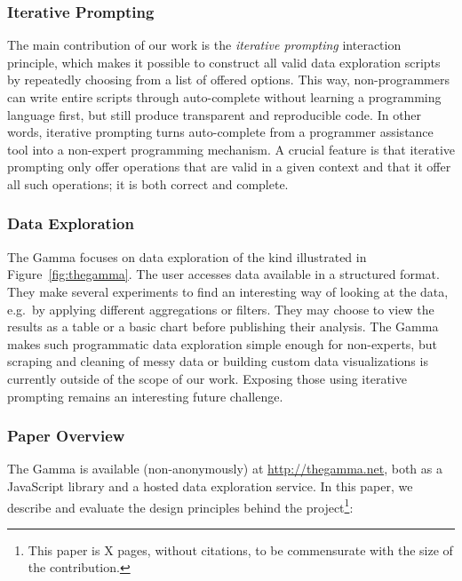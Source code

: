 \documentclass[manuscript,review,anonymous]{acmart}
\begin{document}
\subsubsection*{Iterative Prompting}
The main contribution of our work is the \emph{iterative prompting} interaction principle,
which makes it possible to construct all valid data exploration scripts by repeatedly choosing
from a list of offered options. This way, non-programmers can write entire scripts through
auto-complete without learning a programming language first, but still produce transparent
and reproducible code. In other words, iterative prompting turns auto-complete from a programmer
assistance tool into a non-expert programming mechanism. A crucial feature is that iterative
prompting only offer operations that are valid in a given context and that it offer all such
operations; it is both correct and complete.

\subsubsection*{Data Exploration}
The Gamma focuses on data exploration of the kind illustrated in Figure~\ref{fig:thegamma}.
The user accesses data available in a structured format. They make several experiments to find an
interesting way of looking at the data, e.g.~by applying different aggregations or filters. They
may choose to view the results as a table or a basic chart before publishing their analysis. The
Gamma makes such programmatic data exploration simple enough for non-experts, but scraping and
cleaning of messy data or building custom data visualizations is currently outside of the scope of
our work. Exposing those using iterative prompting remains an interesting future challenge.

\subsubsection*{Paper Overview}
The Gamma is available (non-anonymously) at \url{http://thegamma.net},
both as a JavaScript library and a hosted data exploration service. In this paper, we describe and
evaluate the design principles behind the project\footnote{This paper is X pages, without citations,
to be commensurate with the size of the contribution.}:
\end{document}
